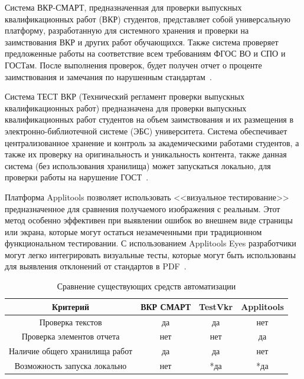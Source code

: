 Система ВКР-СМАРТ, предназначенная для проверки выпускных квалификационных работ (ВКР) студентов, представляет собой универсальную платформу, разработанную для системного хранения и проверки на заимствования ВКР и других работ обучающихся. Также система проверяет предложенные работы на соответствие всем требованиям ФГОС ВО и СПО и ГОСТам. После выполнения проверок, будет получен отчет о проценте заимствования и замечания по нарушенным стандартам~\cite{VKR_VYZ}.

Система ТЕСТ ВКР (Технический регламент проверки выпускных квалификационных работ) предназначена для проверки выпускных квалификационных работ студентов на объем заимствования и их размещения в электронно-библиотечной системе (ЭБС) университета. Система обеспечивает централизованное хранение и контроль за академическими работами студентов, а также их проверку на оригинальность и уникальность контента, также данная система (без использования хранилища) может запускаться локально, для проверки работы на нарушение ГОСТ~\cite{TestVkr}.

Платформа Applitools позволяет использовать <<визуальное тестирование>> предназначенное для сравнения получаемого изображения с реальным. Этот метод особенно эффективен при выявлении ошибок во внешнем виде страницы или экрана, которые могут остаться незамеченными при традиционном функциональном тестировании. С использованием Applitools Eyes разработчики могут легко интегрировать визуальные тесты, которые могут быть использованы для выявления отклонений от стандартов в PDF~\cite{PdfTest}.



\begin{table}[ht]
	\begin{center}
		\begin{threeparttable}
			\caption{\label{t:cmp} Сравнение существующих средств автоматизации}
			\begin{tabular}{|c|c|c|c|}
				\hline
				\textbf{Критерий} & \textbf{ВКР СМАРТ} & \textbf{TestVkr} & \textbf{Applitools} \\ \hline
				Проверка текстов  & да & да & нет\\ \hline
				Проверка элементов отчета & нет & нет & да \\ \hline
				Наличие общего хранилища работ  & да & да & нет \\ \hline
				Возможность запуска локально & нет & *да & *да \\ \hline
			\end{tabular}
		\end{threeparttable}
	\end{center}
\end{table}


